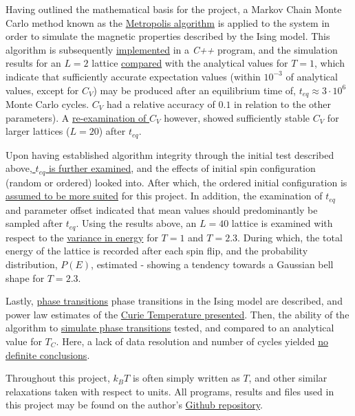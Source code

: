 \documentclass[%
oneside,                 %
final,                   %
10pt]{article}
\begin{document}
Having outlined the mathematical basis for the project, a Markov Chain Monte Carlo method known as the \hyperref[SS:MCMCmethod]{Metropolis algorithm} is  applied to the system in order to simulate the magnetic properties described by the Ising model. This algorithm is subsequently \hyperref[SS:init.algo.impl]{implemented} in a \textit{C++} program, and the simulation results for an $L=2$ lattice \hyperref[SS:R.initialeval]{compared} with the analytical values for $T=1$, which indicate that sufficiently accurate expectation values (within $10^{-3}$ of analytical values, except for $C_V$) may be produced after an equilibrium time of, $t_{eq} \approx 3 \cdot 10^6$ Monte Carlo cycles. $C_V$ had a relative accuracy of $0.1$ in relation to the other parameters). A \hyperref[SS:M.Eq.time]{re-examination of $C_V$} however, showed sufficiently stable $C_V$ for larger lattices ($L=20$) after $t_{eq}$. \newline

Upon having established algorithm integrity through the initial test described above,\hyperref[SS:M.Eq.time]{ $t_{eq}$ is further examined}, and the effects of initial spin configuration (random or ordered) looked into. After which, the ordered initial configuration is \hyperref[SS:Disucssion_eqtime]{assumed to be more suited} for this project. In addition, the examination of $t_{eq}$ and parameter offset indicated that mean values should predominantly be sampled after $t_{eq}$. Using the results above, an $L=40$ lattice is examined with respect to the \hyperref[SS:M.variance ]{variance in energy} for $T=1$ and $T=2.3$. During which, the total energy of the lattice is recorded after each spin flip, and the probability distribution, $P(E)$, estimated - showing a tendency towards a Gaussian bell shape for $T=2.3$. \newline

Lastly, \hyperref[SS:M.Phase_trans]{phase transitions} phase transitions in the Ising model are described, and power law estimates of the \hyperref[SS:Est.Curie]{Curie Temperature presented}. Then, the ability of the algorithm to \hyperref[SS.estCurie]{simulate phase transitions} tested, and compared to an analytical value for $T_C$. Here, a lack of data resolution and number of cycles yielded \hyperref[SS:DR.est.curie]{no definite conclusions}. \newline

Throughout this project, $k_B T$ is often simply written as $T$, and other similar relaxations taken with respect to units. All programs, results and files used in this project may be found on the author's \href{https://github.com/johanere/CP4}{Github repository}.
\end{document}
